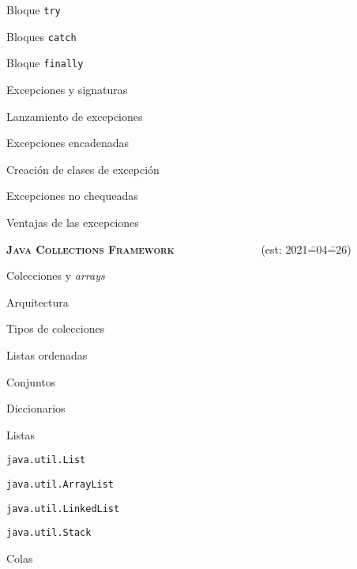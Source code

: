 \begin{longenum}
\begin{longenum}
        \begin{longenum}
            \item Bloque \texttt{try}
            \item Bloques \texttt{catch}
            \item Bloque \texttt{finally}
        \end{longenum}
        \item Excepciones y signaturas
        \item Lanzamiento de excepciones
        \begin{longenum}
            \item Excepciones encadenadas
            \item Creación de clases de excepción
        \end{longenum}
        \item Excepciones no chequeadas
        \item Ventajas de las excepciones
    \end{longenum}
    \item \textbf{\textsc{Java Collections Framework}} \ \ \ \ \ \ \ \ \ \ \ \ \ \ \ (est: 2021\==04\==26)
    \begin{longenum}
        \item Colecciones y \textit{arrays}
        \item Arquitectura
        \item Tipos de colecciones
        \begin{longenum}
            \item Listas ordenadas
            \item Conjuntos
            \item Diccionarios
        \end{longenum}
        \item Listas
        \begin{longenum}
            \item \texttt{java.util.List}
            \begin{longenum}
                \item \texttt{java.util.ArrayList}
                \item \texttt{java.util.LinkedList}
                \item \texttt{java.util.Stack}
            \end{longenum}
        \end{longenum}
        \item Colas

\end{longenum}
\end{longenum}
